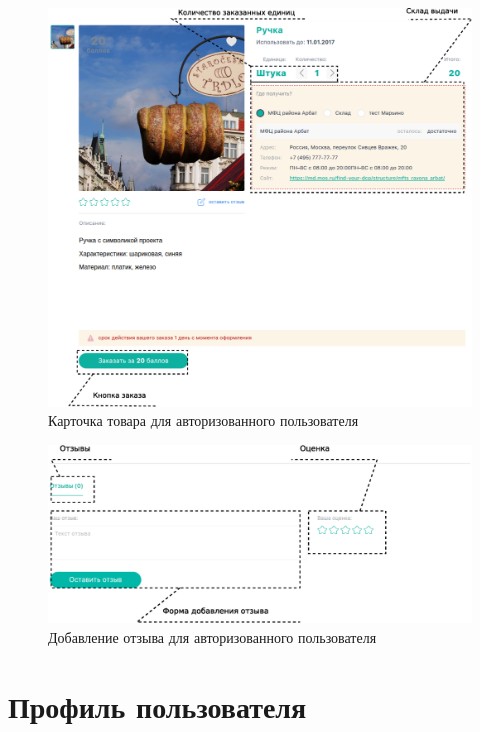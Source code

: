             \begin{figure}
                \center
                \includegraphics[width=170mm]{04_auth_funcs/figures/05.eps}
                \caption{Карточка товара для авторизованного пользователя}
                \label{fig:auth_goods_cart}
            \end{figure}
                
            \begin{figure}
                \center
                \includegraphics[width=170mm]{04_auth_funcs/figures/06.eps}
                \caption{Добавление отзыва для авторизованного пользователя}
                \label{fig:auth_goods_cart_otz}
            \end{figure}

                
     \section{Профиль пользователя}

